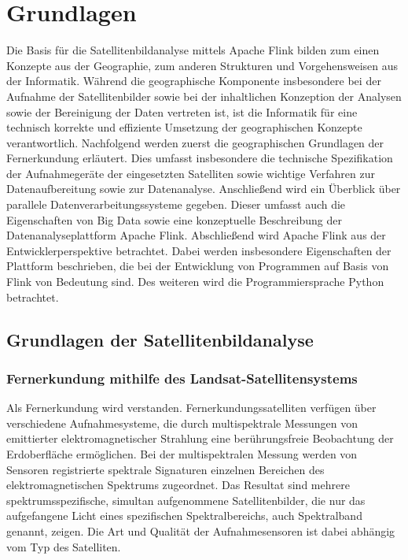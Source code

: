 
\chapter{Grundlagen}

Die Basis für die Satellitenbildanalyse mittels Apache Flink bilden zum einen Konzepte aus der Geographie, zum anderen Strukturen und Vorgehensweisen aus der Informatik. Während die geographische Komponente insbesondere bei der Aufnahme der Satellitenbilder sowie bei der inhaltlichen Konzeption der Analysen sowie der Bereinigung der Daten vertreten ist, ist die Informatik für eine technisch korrekte und effiziente Umsetzung der geographischen Konzepte verantwortlich. Nachfolgend werden zuerst die geographischen Grundlagen der Fernerkundung erläutert. Dies umfasst insbesondere die technische Spezifikation der Aufnahmegeräte der eingesetzten Satelliten sowie wichtige Verfahren zur Datenaufbereitung sowie zur Datenanalyse. Anschließend wird ein Überblick über parallele Datenverarbeitungssysteme gegeben. Dieser umfasst auch die Eigenschaften von Big Data sowie eine konzeptuelle Beschreibung der Datenanalyseplattform Apache Flink. Abschließend wird Apache Flink aus der Entwicklerperspektive betrachtet. Dabei werden insbesondere Eigenschaften der Plattform beschrieben, die bei der Entwicklung von Programmen auf Basis von Flink von Bedeutung sind. Des weiteren wird die Programmiersprache Python betrachtet.

\section{Grundlagen der Satellitenbildanalyse}
\subsection{Fernerkundung mithilfe des Landsat-Satellitensystems}

Als Fernerkundung wird  verstanden. Fernerkundungssatelliten verfügen über verschiedene Aufnahmesysteme, die durch multispektrale Messungen von emittierter elektromagnetischer Strahlung eine berührungsfreie Beobachtung der Erdoberfläche ermöglichen. Bei der multispektralen Messung werden von Sensoren registrierte spektrale Signaturen einzelnen Bereichen des elektromagnetischen Spektrums zugeordnet. Das Resultat sind mehrere spektrumsspezifische, simultan aufgenommene Satellitenbilder, die nur das aufgefangene Licht eines spezifischen Spektralbereichs, auch Spektralband genannt, zeigen. Die Art und Qualität der Aufnahmesensoren ist dabei abhängig vom Typ des Satelliten. 

